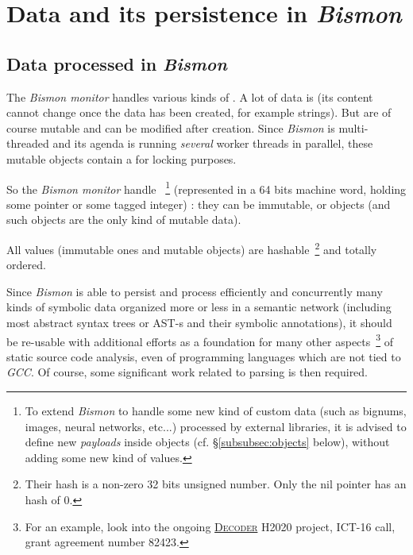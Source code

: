 \section{Data and its persistence in \emph{Bismon}}
\label{sec:datapersist}

\subsection{Data processed in \emph{Bismon}}

\label{subsec:dataproc}

The \emph{Bismon monitor} handles various kinds of
. A lot of data is  (its
content cannot change once the data has been created, for example
strings). But  are of course mutable
and can be modified after creation. Since \emph{Bismon} is
multi-threaded and its agenda is running \emph{several} worker threads
in parallel, these mutable objects contain a  for
locking purposes.

So the \emph{Bismon monitor} handle
~\footnote{To extend \emph{Bismon} to
  handle some new kind of custom data (such as bignums, images, neural
  networks, etc...) processed by external libraries, it is advised to
  define new \emph{payloads} inside objects
  (cf. \S\ref{subsubsec:objects} below), without adding some new kind
  of values.} (represented in a 64 bits machine word, holding some
pointer or some tagged integer) : they can be immutable, or objects
(and such objects are the only kind of mutable data).

All values (immutable ones and mutable objects) are
hashable~\footnote{Their hash is a non-zero 32 bits unsigned
  number. Only the nil pointer has an hash of 0.}  and totally
ordered.

\medskip

Since \emph{Bismon} is able to persist and process efficiently and
concurrently many kinds of symbolic data organized more or less in a
semantic network (including most abstract syntax trees or AST-s
 and their symbolic annotations), it should be re-usable
with additional efforts as a foundation for many other
aspects~\footnote{For an example, look into the ongoing 
  \href{https://www.decoder-project.eu/}{\textsc{Decoder}}
   H2020
  project, ICT-16 call, grant agreement number 82423.} of static
source code analysis, even of programming languages which are not tied
to \emph{GCC}. Of course, some significant work related to parsing is
then required.

